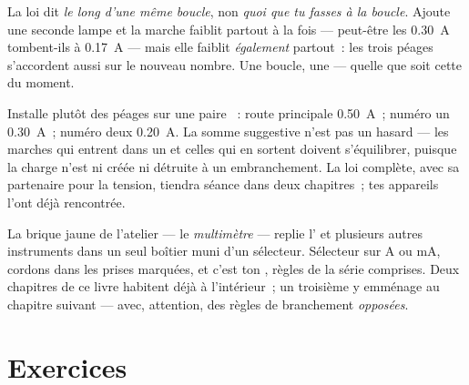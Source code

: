 \begin{example}\label{ex:g8:intensity-ammeter:fineprint}
La loi dit \emph{le long d'une même boucle}, non \emph{quoi que tu
fasses à la boucle}. Ajoute une seconde lampe  et la marche
faiblit partout à la fois --- peut-être les \qty{0.30}{A}
tombent-ils à \qty{0.17}{A} --- mais elle faiblit \emph{également}
partout~: les trois péages s'accordent aussi sur le nouveau nombre.
Une boucle, une  --- quelle que soit cette  du
moment.
\end{example}

\begin{example}\label{ex:g8:intensity-ammeter:junction}
Installe plutôt des péages sur une paire ~: route
principale \qty{0.50}{A}~;  numéro un \qty{0.30}{A}~; 
numéro deux \qty{0.20}{A}. La somme suggestive n'est pas un hasard
--- les marches qui entrent dans un  et celles qui en sortent
doivent s'équilibrer, puisque la charge n'est ni créée ni détruite à
un embranchement. La loi complète, avec sa partenaire pour la
tension, tiendra séance dans deux chapitres~; tes appareils l'ont
déjà rencontrée.
\end{example}

\begin{remark}[Le multimètre]\label{rem:g8:intensity-ammeter:multimeter}
La brique jaune de l'atelier --- le \emph{multimètre} --- replie
l' et plusieurs autres instruments dans un seul boîtier
muni d'un sélecteur. Sélecteur sur \unit{A} ou \unit{mA}, cordons
dans les prises marquées, et c'est ton , règles de la
série comprises. Deux chapitres de ce livre habitent déjà à
l'intérieur~; un troisième y emménage au chapitre suivant --- avec,
attention, des règles de branchement \emph{opposées}.
\end{remark}

\section{Exercices}


